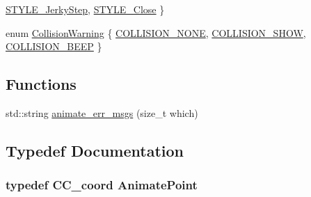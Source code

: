 \begin{DoxyCompactItemize}
\hyperlink{a00196_a56c9857b8353188d8e6823c408ba71ada49d5536f262253a66ed992880ac44059}{S\-T\-Y\-L\-E\-\_\-\-Jerky\-Step}, 
\hyperlink{a00196_a56c9857b8353188d8e6823c408ba71adaa01a1a9e678071c740d9a7c00625ddc1}{S\-T\-Y\-L\-E\-\_\-\-Close}
 \}
\item 
enum \hyperlink{a00196_acf6b899fff4fd35a31a3e8884229f118}{Collision\-Warning} \{ \hyperlink{a00196_acf6b899fff4fd35a31a3e8884229f118abfae9ad0ec412ab16d4683030bd071df}{C\-O\-L\-L\-I\-S\-I\-O\-N\-\_\-\-N\-O\-N\-E}, 
\hyperlink{a00196_acf6b899fff4fd35a31a3e8884229f118a7b0931d060574b56567035ac6a243b57}{C\-O\-L\-L\-I\-S\-I\-O\-N\-\_\-\-S\-H\-O\-W}, 
\hyperlink{a00196_acf6b899fff4fd35a31a3e8884229f118a2cf5e7c8563417eaff31132b85d99cd9}{C\-O\-L\-L\-I\-S\-I\-O\-N\-\_\-\-B\-E\-E\-P}
 \}
\end{DoxyCompactItemize}
\subsection*{Functions}
\begin{DoxyCompactItemize}
\item 
std\-::string \hyperlink{a00196_aab4ab291804c5a225333f30233413fc7}{animate\-\_\-err\-\_\-msgs} (size\-\_\-t which)
\end{DoxyCompactItemize}


\subsection{Typedef Documentation}
\hypertarget{a00196_a91212e6bb797b2b440819b6a9a86f702}{
\subsubsection[{Animate\-Point}]{\setlength{\rightskip}{0pt plus 5cm}typedef {\bf C\-C\-\_\-coord} {\bf Animate\-Point}}}\label{a00196_a91212e6bb797b2b440819b6a9a86f702}


